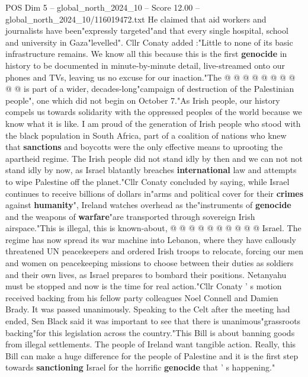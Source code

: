 \begin{textsample}{POS Dim 5 – global\_north\_2024\_10 – Score 12.00 – global\_north\_2024\_10/116019472.txt}
He claimed that aid workers and journalists have been"expressly targeted"and that every single hospital, school and university in Gaza"levelled".
Cllr Conaty added :"Little to none of its basic infrastructure remains.
We know all this because this is the first \textbf{genocide} in history to be documented in minute-by-minute detail, live-streamed onto our phones and TVs, leaving us no excuse for our inaction."The @ @ @ @ @ @ @ @ @ @ is part of a wider, decades-long"campaign of destruction of the Palestinian people", one which did not begin on October 7."As Irish people, our history compels us towards solidarity with the oppressed peoples of the world because we know what it is like.
I am proud of the generation of Irish people who stood with the black population in South Africa, part of a coalition of nations who knew that \textbf{sanctions} and boycotts were the only effective means to uprooting the apartheid regime.
The Irish people did not stand idly by then and we can not not stand idly by now, as Israel blatantly breaches \textbf{international} law and attempts to wipe Palestine off the planet."Cllr Conaty concluded by saying, while Israel continues to receive billions of dollars in"arms and political cover for their \textbf{crimes} against \textbf{humanity}", Ireland watches overhead as the"instruments of \textbf{genocide} and the weapons of \textbf{warfare}"are transported through sovereign Irish airspace."This is illegal, this is known-about, @ @ @ @ @ @ @ @ @ @ Israel.
The regime has now spread its war machine into Lebanon, where they have callously threatened UN peacekeepers and ordered Irish troops to relocate, forcing our men and women on peacekeeping missions to choose between their duties as soldiers and their own lives, as Israel prepares to bombard their positions.
Netanyahu must be stopped and now is the time for real action."Cllr Conaty ' s motion received backing from his fellow party colleagues Noel Connell and Damien Brady.
It was passed unanimously.
Speaking to the Celt after the meeting had ended, Sen Black said it was important to see that there is unanimous"grassroots backing"for this legislation across the country."This Bill is about banning goods from illegal settlements.
The people of Ireland want tangible action.
Really, this Bill can make a huge difference for the people of Palestine and it is the first step towards \textbf{sanctioning} Israel for the horrific \textbf{genocide} that ' s happening."

\end{textsample}
